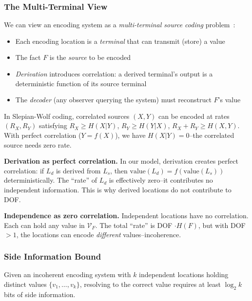 \subsubsection{The Multi-Terminal View}

We can view an encoding system as a \emph{multi-terminal source coding} problem~\cite{slepian1973noiseless,cover2006elements}:
\begin{itemize}
\tightlist
\item Each encoding location is a \emph{terminal} that can transmit (store) a value
\item The fact $F$ is the \emph{source} to be encoded
\item \emph{Derivation} introduces correlation: a derived terminal's output is a deterministic function of its source terminal
\item The \emph{decoder} (any observer querying the system) must reconstruct $F$'s value
\end{itemize}

In Slepian-Wolf coding, correlated sources $(X, Y)$ can be encoded at rates $(R_X, R_Y)$ satisfying $R_X \geq H(X|Y)$, $R_Y \geq H(Y|X)$, $R_X + R_Y \geq H(X,Y)$. With perfect correlation ($Y = f(X)$), we have $H(X|Y) = 0$--the correlated source needs zero rate.

\textbf{Derivation as perfect correlation.} In our model, derivation creates perfect correlation: if $L_d$ is derived from $L_s$, then $\text{value}(L_d) = f(\text{value}(L_s))$ deterministically. The ``rate'' of $L_d$ is effectively zero--it contributes no independent information. This is why derived locations do not contribute to DOF.

\textbf{Independence as zero correlation.} Independent locations have no correlation. Each can hold any value in $\mathcal{V}_F$. The total ``rate'' is DOF $\cdot H(F)$, but with DOF $> 1$, the locations can encode \emph{different} values--incoherence.

\subsubsection{Side Information Bound}

\begin{theorem}\label{thm:side-info}
Given an incoherent encoding system with $k$ independent locations holding distinct values $\{v_1, \ldots, v_k\}$, resolving to the correct value requires at least $\log_2 k$ bits of side information.
\end{theorem}

